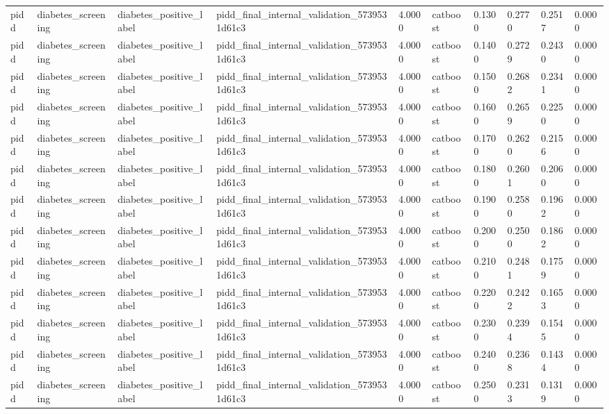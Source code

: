 \begin{tabular}{llllllllll}
pidd & diabetes\_screening & diabetes\_positive\_label & pidd\_final\_internal\_validation\_5739531d61c3 & 4.0000 & catboost & 0.1300 & 0.2770 & 0.2517 & 0.0000 \\
pidd & diabetes\_screening & diabetes\_positive\_label & pidd\_final\_internal\_validation\_5739531d61c3 & 4.0000 & catboost & 0.1400 & 0.2729 & 0.2430 & 0.0000 \\
pidd & diabetes\_screening & diabetes\_positive\_label & pidd\_final\_internal\_validation\_5739531d61c3 & 4.0000 & catboost & 0.1500 & 0.2682 & 0.2341 & 0.0000 \\
pidd & diabetes\_screening & diabetes\_positive\_label & pidd\_final\_internal\_validation\_5739531d61c3 & 4.0000 & catboost & 0.1600 & 0.2659 & 0.2250 & 0.0000 \\
pidd & diabetes\_screening & diabetes\_positive\_label & pidd\_final\_internal\_validation\_5739531d61c3 & 4.0000 & catboost & 0.1700 & 0.2620 & 0.2156 & 0.0000 \\
pidd & diabetes\_screening & diabetes\_positive\_label & pidd\_final\_internal\_validation\_5739531d61c3 & 4.0000 & catboost & 0.1800 & 0.2601 & 0.2060 & 0.0000 \\
pidd & diabetes\_screening & diabetes\_positive\_label & pidd\_final\_internal\_validation\_5739531d61c3 & 4.0000 & catboost & 0.1900 & 0.2580 & 0.1962 & 0.0000 \\
pidd & diabetes\_screening & diabetes\_positive\_label & pidd\_final\_internal\_validation\_5739531d61c3 & 4.0000 & catboost & 0.2000 & 0.2500 & 0.1862 & 0.0000 \\
pidd & diabetes\_screening & diabetes\_positive\_label & pidd\_final\_internal\_validation\_5739531d61c3 & 4.0000 & catboost & 0.2100 & 0.2481 & 0.1759 & 0.0000 \\
pidd & diabetes\_screening & diabetes\_positive\_label & pidd\_final\_internal\_validation\_5739531d61c3 & 4.0000 & catboost & 0.2200 & 0.2422 & 0.1653 & 0.0000 \\
pidd & diabetes\_screening & diabetes\_positive\_label & pidd\_final\_internal\_validation\_5739531d61c3 & 4.0000 & catboost & 0.2300 & 0.2394 & 0.1545 & 0.0000 \\
pidd & diabetes\_screening & diabetes\_positive\_label & pidd\_final\_internal\_validation\_5739531d61c3 & 4.0000 & catboost & 0.2400 & 0.2368 & 0.1434 & 0.0000 \\
pidd & diabetes\_screening & diabetes\_positive\_label & pidd\_final\_internal\_validation\_5739531d61c3 & 4.0000 & catboost & 0.2500 & 0.2313 & 0.1319 & 0.0000 \\

\end{tabular}
